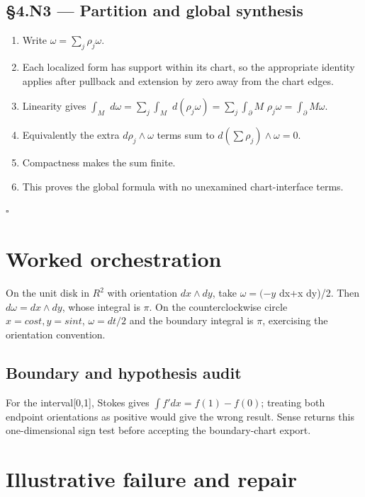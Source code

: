 \documentclass[preprint,12pt,aps,pra,showkeys,amsmath,amssymb,superscriptaddress,floatfix]{revtex4-2}
\theoremstyle{definition}
\theoremstyle{remark}
\begin{document}
\subsection{§4.N3 --- Partition and global
synthesis}\label{n3-partition-and-global-synthesis}

\begin{enumerate}
\def\labelenumi{\arabic{enumi}.}
\item
  Write \(\omega =\sum _j\rho _j\omega\).
\item
  Each localized form has support within its chart, so the appropriate
  identity applies after pullback and extension by zero away from the
  chart edges.
\item
  Linearity gives \(\int _M\) \(d\omega =\sum _j\int _M\)
  \(d(\rho _j\omega )=\sum _j\int _\partial M\)
  \(\rho _j\omega =\int _\partial M\omega\).
\item
  Equivalently the extra \(d\rho _j\wedge \omega\) terms sum to
  \(d(\sum \rho _j)\wedge \omega =0\).
\item
  Compactness makes the sum finite.
\item
  This proves the global formula with no unexamined chart-interface
  terms.
\end{enumerate}

\hfill$\square$

\section{Worked orchestration}

On the unit disk in \(R^{2}\) with orientation \(dx\wedge dy\), take
\(\omega =(-y\) dx+x dy)/2. Then \(d\omega =dx\wedge dy\), whose
integral is \(\pi\). On the counterclockwise circle \(x=cost,y=sint\),
\(\omega =dt/2\) and the boundary integral is \(\pi\), exercising the
orientation convention.

\subsection{Boundary and hypothesis audit}

For the interval{[}0,1{]}, Stokes gives \(\int f'dx=f(1)-f(0)\);
treating both endpoint orientations as positive would give the wrong
result. Sense returns this one-dimensional sign test before accepting
the boundary-chart export.

\section{Illustrative failure and repair}
\end{document}
